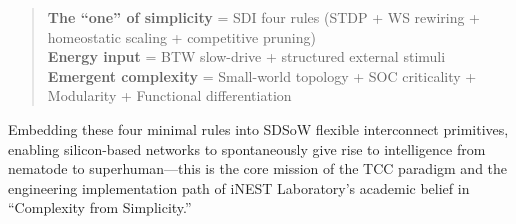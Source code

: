 \documentclass[12pt,a4paper]{article}
\begin{document}
\begin{quote}
\textbf{The ``one'' of simplicity} = SDI four rules (STDP + WS rewiring + homeostatic scaling + competitive pruning)\\
\textbf{Energy input} = BTW slow-drive + structured external stimuli\\
\textbf{Emergent complexity} = Small-world topology + SOC criticality + Modularity + Functional differentiation
\end{quote}

Embedding these four minimal rules into SDSoW flexible interconnect primitives, enabling silicon-based networks to spontaneously give rise to intelligence from nematode to superhuman---this is the core mission of the TCC paradigm and the engineering implementation path of iNEST Laboratory's academic belief in ``Complexity from Simplicity.''



\end{document}
